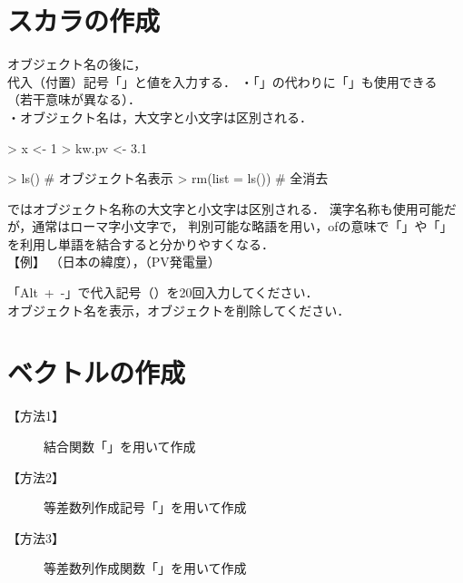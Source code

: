 \documentclass[../main]{subfiles}
\begin{document}
\tcbstartrecording\relax

\section{スカラの作成}

{
  オブジェクト名の後に，\\
  代入（付置）記号「\cs{<-}」と値を入力する．
}
・「\cs{<-}」の代わりに「\cs{=}」も使用できる （若干意味が異なる）．\\
・オブジェクト名は，大文字と小文字は区別される．



\begin{ConsoleR}
> x <- 1
> kw.pv <- 3.1
\end{ConsoleR}

\begin{ConsoleR}
> ls()            # オブジェクト名表示
> rm(list = ls()) # 全消去
\end{ConsoleR}

\R ではオブジェクト名称の大文字と小文字は区別される．
漢字名称も使用可能だが，通常はローマ字小文字で，
判別可能な略語を用い，ofの意味で「」や「\cs{\_}」
を利用し単語を結合すると分かりやすくなる．\\[5mm]
【例】 （日本の緯度），（PV発電量）

\begin{exercise}
  「Alt~+~-」で代入記号（\cs{<-}）を20回入力してください．\\
  オブジェクト名を表示，オブジェクトを削除してください．
  \tcblower
\end{exercise}

\section{ベクトルの作成}

{
  \begin{description}
    \item[【方法1】] 結合関数「」を用いて作成
    \item[【方法2】] 等差数列作成記号「\cs{:}」を用いて作成
    \item[【方法3】] 等差数列作成関数「」を用いて作成
  \end{description}
}
\end{document}
